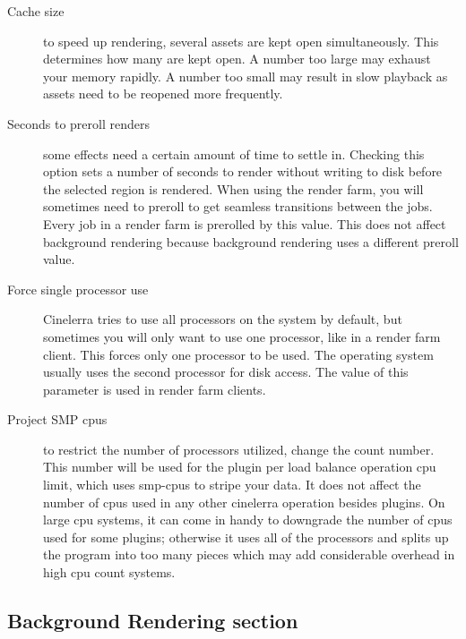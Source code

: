 \begin{description}
    \item[Cache size] to speed up rendering, several assets are kept open simultaneously. This determines how     many are kept open. A number too large may exhaust your memory rapidly. A number too small may result in slow playback as assets need to be reopened more frequently.
    \item[Seconds to preroll renders] some effects need a certain amount of time to settle in. Checking this option sets a number of seconds to render without writing to disk before the selected region is rendered. When using the render farm, you will sometimes need to preroll to get seamless transitions between the     jobs. Every job in a render farm is prerolled by this value. This does not affect background rendering because background rendering uses a different preroll value.
    \item[Force single processor use] Cinelerra tries to use all processors on the system by default, but sometimes you will only want to use one processor, like in a render farm client. This forces only one processor to be used.  The operating system usually uses the second processor for disk access. The value of this parameter is used in render farm clients.
    \item[Project SMP cpus ] to restrict the number of processors utilized, change the count number.  This number will be used for the plugin per load balance operation cpu limit, which uses smp-cpus to stripe your data. It does not affect the number of cpus used in any other cinelerra operation besides plugins. On large cpu systems, it can come in handy to downgrade the number of cpus used for some plugins; otherwise it uses all of the processors and splits up the program into too many pieces which may add
    considerable overhead in high cpu count systems.
\end{description}

\subsection{Background Rendering section}%
\label{sub:background_rendering_section}

